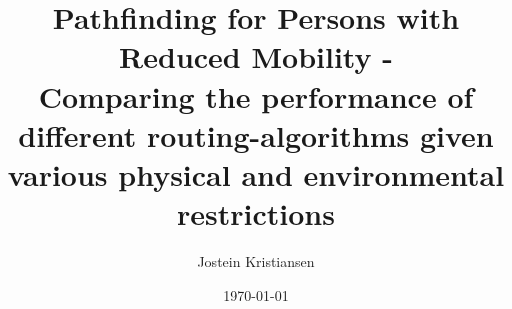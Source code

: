 
\title{Pathfinding for Persons with Reduced Mobility -\\
	Comparing the performance of  different routing-algorithms given various physical and environmental restrictions}

\author{Jostein Kristiansen}




\date{\today} %




\maketitle



